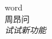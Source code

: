 \documentclass[twocolumn]{ctexbook}
\newcommand{\point}[1]{{\color{red}#1}}
\newcommand{\expand}[1]{{\Large\colorbox{-red!90}{#1}}}
\begin{document}
\point{word\\}
\expand{周昂问}\\
\em{试试新功能}\\
\color{red}{bule}
\end{document}
